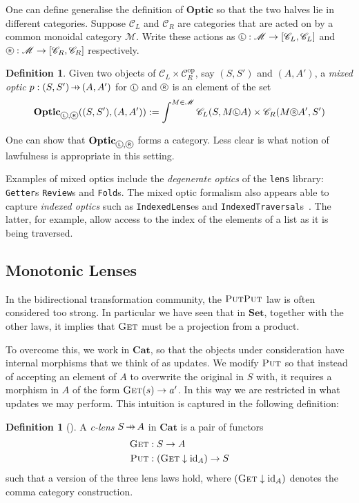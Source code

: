 \documentclass[11pt,letterpaper]{article}
\theoremstyle{plain}
\theoremstyle{definition}
\newtheorem{definition}[theorem]{Definition}
\newcommand{\C}{\mathscr{C}}
\newcommand{\M}{\mathscr{M}}
\newcommand{\lenslib}{\texttt{lens}}
\newcommand{\Set}{\mathbf{Set}}
\newcommand{\Cat}{\mathbf{Cat}}
\newcommand{\Optic}{\mathbf{Optic}}
\newcommand{\id}{\mathrm{id}}
\newcommand{\op}{\mathrm{op}}
\newcommand*\circled[1]{\tikz[baseline={([yshift=-0.65ex]current bounding box.center)}]{
   \node[shape=circle,draw,inner sep=1pt] (char) {#1};}}
\newcommand{\actL}{{\circled{\tiny$\mathsf{L}$}}}
\newcommand{\actR}{{\circled{\tiny$\mathsf{R}$}}}
\newcommand{\fget}{\textsc{Get}}
\newcommand{\fput}{\textsc{Put}}
\newcommand{\hto}{\ensuremath{\,\mathaccent\shortmid\rightarrow\,}}
\begin{document}
One can define generalise the definition of $\Optic$ so that the two halves lie in different categories. Suppose $\C_L$ and $\C_R$ are categories that are acted on by a common monoidal category $\M$. Write these actions as $\actL : \M \to [\C_L, \C_L]$ and $\actR : \M \to [\C_R, \C_R]$ respectively.

\begin{definition}
  Given two objects of $\C_L \times \C_R^\op$, say $(S, S')$ and $(A, A')$, a \emph{mixed optic} $p : (S, S') \hto (A, A')$ for $\actL$ and $\actR$ is an element of the set
  \begin{align*}
    \Optic_{\actL, \actR}((S, S'), (A, A')) := \int^{M \in \M} \C_L(S, M \actL A) \times \C_R(M \actR A', S')
  \end{align*}
\end{definition}
One can show that $\Optic_{\actL, \actR}$ forms a category. Less clear is what notion of lawfulness is appropriate in this setting.

Examples of mixed optics include the \emph{degenerate optics} of the \lenslib{} library: \texttt{Getter}s \texttt{Review}s and \texttt{Fold}s. The mixed optic formalism also appears able to capture \emph{indexed optics} such as \texttt{IndexedLens}es and \texttt{IndexedTraversal}s~\cite{ProfunctorOpticsPost}. The latter, for example, allow access to the index of the elements of a list as it is being traversed.

\subsection{Monotonic Lenses}
In the bidirectional transformation community, the $\fput\fput$ law is often considered too strong. In particular we have seen that in $\Set$, together with the other laws, it implies that $\fget$ must be a projection from a product.

To overcome this, we work in $\Cat$, so that the objects under consideration have internal morphisms that we think of as updates. We modify $\fput$ so that instead of accepting an element of $A$ to overwrite the original in $S$ with, it requires a morphism in $A$ of the form $\fget(s) \to a'$. In this way we are restricted in what updates we may perform. This intuition is captured in the following definition:

\begin{definition}[{\cite[Definition 4.1]{LensesFibrationsAndUniversalTranslations}}]
A \emph{c-lens} $S \hto A$ in $\Cat$ is a pair of functors
\begin{align*}
\fget &: S \to A \\
\fput &: (\fget \downarrow \id_{A}) \to S
\end{align*}
such that a version of the three lens laws hold, where $(\fget \downarrow \id_{A})$ denotes the comma category construction.
\end{definition}
\end{document}
